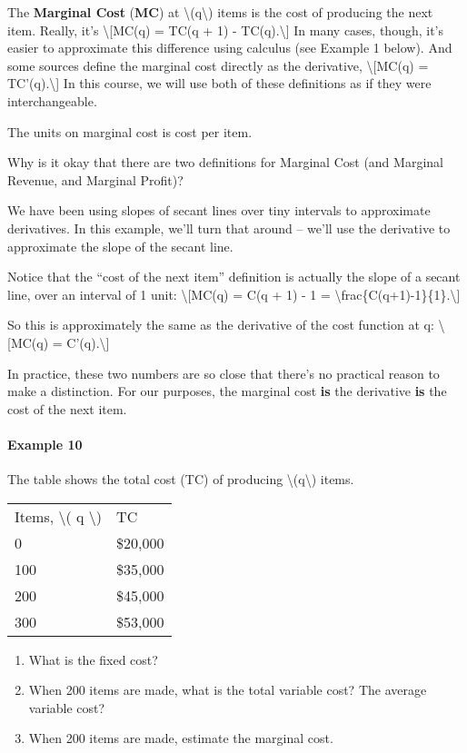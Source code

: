 The \textbf{Marginal Cost} (\textbf{MC}) at
\textbackslash{}(q\textbackslash{}) items is the cost of producing the
next item. Really, it's \textbackslash{}{[}MC(q) = TC(q + 1) -
TC(q).\textbackslash{}{]} In many cases, though, it's easier to
approximate this difference using calculus (see Example 1 below). And
some sources define the marginal cost directly as the derivative,
\textbackslash{}{[}MC(q) = TC'(q).\textbackslash{}{]} In this course, we
will use both of these definitions as if they were interchangeable.

The units on marginal cost is cost per item.

Why is it okay that there are two definitions for Marginal Cost (and
Marginal Revenue, and Marginal Profit)?

We have been using slopes of secant lines over tiny intervals to
approximate derivatives. In this example, we'll turn that around --
we'll use the derivative to approximate the slope of the secant line.

Notice that the ``cost of the next item'' definition is actually the
slope of a secant line, over an interval of 1 unit:
\textbackslash{}{[}MC(q) = C(q + 1) - 1 =
\textbackslash{}frac\{C(q+1)-1\}\{1\}.\textbackslash{}{]}

So this is approximately the same as the derivative of the cost function
at q: \textbackslash{}{[}MC(q) = C'(q).\textbackslash{}{]}

In practice, these two numbers are so close that there's no practical
reason to make a distinction. For our purposes, the marginal cost
\textbf{is} the derivative \textbf{is} the cost of the next item.

\hypertarget{example-10}{%
\paragraph{Example 10}\label{example-10}}

The table shows the total cost (TC) of producing
\textbackslash{}(q\textbackslash{}) items.

\begin{longtable}[]{@{}ll@{}}
\toprule
\endhead
Items, \textbackslash{}( q \textbackslash{}) & TC\tabularnewline
0 & \$20,000\tabularnewline
100 & \$35,000\tabularnewline
200 & \$45,000\tabularnewline
300 & \$53,000\tabularnewline
\bottomrule
\end{longtable}

\begin{enumerate}
\tightlist
\item
  What is the fixed cost?
\item
  When 200 items are made, what is the total variable cost? The average
  variable cost?
\item
  When 200 items are made, estimate the marginal cost.
\end{enumerate}

